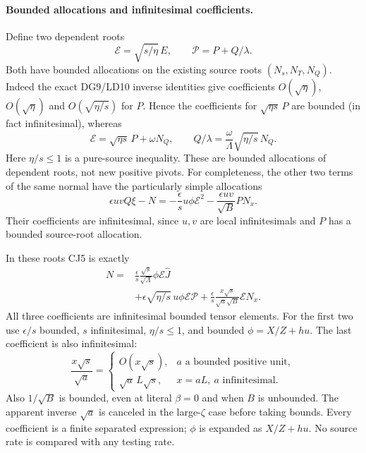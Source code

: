 \paragraph{Bounded allocations and infinitesimal coefficients.}
Define two dependent roots
\[
 \mathcal E=\sqrt{s/\eta}\,E,
 \qquad \mathcal P=P+Q/\lambda.
\]
Both have bounded allocations on the existing source roots
$(N_s,N_T,N_Q)$.  Indeed the exact DG9/LD10 inverse identities give
coefficients $O(\sqrt\eta)$, $O(\sqrt\eta)$ and
$O(\sqrt{\eta/s})$ for $P$.  Hence the coefficients for
$\sqrt{\eta s}\,P$ are bounded (in fact infinitesimal), whereas
\[
 \mathcal E=\sqrt{\eta s}\,P+\omega N_Q,
 \qquad
 Q/\lambda=\frac{\omega}{\Lambda}\sqrt{\eta/s}\,N_Q.
                                                               \tag{CJ6}
\]
Here $\eta/s\le1$ is a pure-source inequality.  These are bounded
allocations of dependent roots, not new positive pivots.
For completeness, the other two terms of the same normal have
the particularly simple allocations
\[
 \epsilon uvQ\xi-N
   =-\frac{\epsilon}{s}u\phi\mathcal E^2
     -\frac{\epsilon uv}{\sqrt B}PN_x.               \tag{CJ6a}
\]
Their coefficients are infinitesimal, since $u,v$ are local
infinitesimals and $P$ has a bounded source-root allocation.

In these roots CJ5 is exactly
\[
\begin{split}
 N={}&\frac{\epsilon}{s}\frac{\sqrt s}{\sqrt\Lambda}
                  \phi\mathcal E\widehat J\\
 &+\epsilon\sqrt{\eta/s}\,u\phi\mathcal E\mathcal P
   +\frac{\epsilon}{s}
       \frac{x\sqrt s}{\sqrt a\sqrt B}\mathcal E N_x .
\end{split}                                                    \tag{CJ7}
\]
All three coefficients are infinitesimal bounded tensor elements.
For the first two use $\epsilon/s$ bounded, $s$ infinitesimal,
$\eta/s\le1$, and bounded
$\phi=X/Z+hu$.  The last coefficient is also infinitesimal:
\[
 \frac{x\sqrt s}{\sqrt a}=
 \begin{cases}
 O(x\sqrt s),&a\text{ a bounded positive unit},\\
 \sqrt a\,L\sqrt s,&x=aL,\ a\text{ infinitesimal}.
 \end{cases}                                                   \tag{CJ8}
\]
Also $1/\sqrt B$ is bounded, even at literal $\beta=0$ and when
$B$ is unbounded.  The apparent inverse $\sqrt a$ is canceled in
the large-$\zeta$ case before taking bounds.  Every coefficient is
a finite separated expression; $\phi$ is expanded as $X/Z+hu$.
No source rate is compared with any testing rate.

